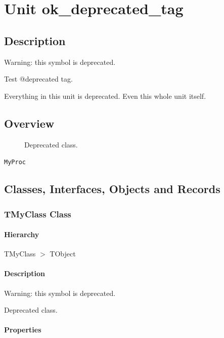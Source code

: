 \documentclass{report}
\begin{document}
\chapter{Unit ok{\_}deprecated{\_}tag}
\section{Description}
Warning: this symbol is deprecated.

Test @deprecated tag.\hfill\vspace*{1ex}



Everything in this unit is deprecated. Even this whole unit itself.


\section{Overview}
\begin{description}
\item[\texttt{\begin{ttfamily}TMyClass\end{ttfamily} Class}] Deprecated class.
\end{description}
\begin{description}
\item[\texttt{MyProc}]
\end{description}
\section{Classes, Interfaces, Objects and Records}
\subsection*{TMyClass Class}
\subsubsection*{\large{\textbf{Hierarchy}}\normalsize\hspace{1ex}\hfill}
TMyClass {$>$} TObject
\subsubsection*{\large{\textbf{Description}}\normalsize\hspace{1ex}\hfill}
Warning: this symbol is deprecated.

 Deprecated class.\subsubsection*{\large{\textbf{Properties}}\normalsize\hspace{1ex}\hfill}
\end{document}
